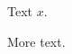 \documentclass{article}
\begin{document}
Text $x$.
\begin{minipage}{0.5\textwidth}\printnomenclature\end{minipage}
More text.
\end{document}
